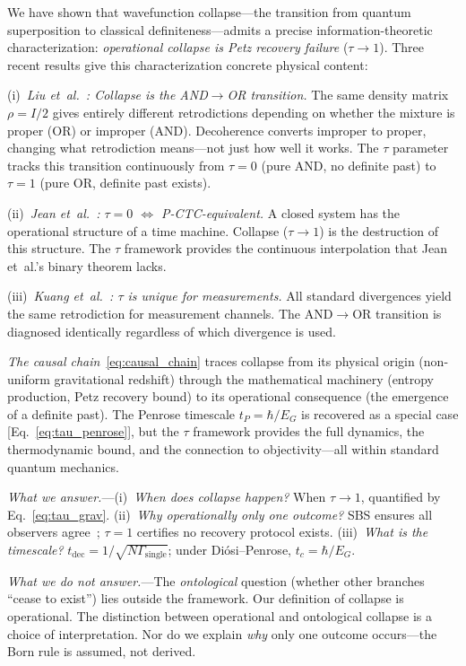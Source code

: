\documentclass[prl,twocolumn,superscriptaddress,longbibliography,floatfix]{revtex4-2}
\newcommand{\tauasym}{\tau}
\begin{document}
We have shown that wavefunction collapse---the transition from quantum
superposition to classical definiteness---admits a precise
information-theoretic characterization: \emph{operational collapse
is Petz recovery failure} ($\tauasym \to 1$).  Three recent results
give this characterization concrete physical content:

(i)~\emph{Liu et~al.~\cite{Liu2026}: Collapse is the AND$\to$OR
transition.}  The same density matrix $\rho = I/2$ gives entirely
different retrodictions depending on whether the mixture is proper
(OR) or improper (AND).  Decoherence converts improper to proper,
changing what retrodiction means---not just how well it works.
The $\tauasym$ parameter tracks this transition continuously from
$\tauasym = 0$ (pure AND, no definite past) to $\tauasym = 1$
(pure OR, definite past exists).

(ii)~\emph{Jean et~al.~\cite{Jean2025}: $\tauasym = 0$
$\Leftrightarrow$ P-CTC-equivalent.}  A closed system has the
operational structure of a time machine.  Collapse
($\tauasym \to 1$) is the destruction of this structure.  The
$\tauasym$ framework provides the continuous interpolation that
Jean et~al.'s binary theorem lacks.

(iii)~\emph{Kuang et~al.~\cite{Kuang2025}: $\tauasym$ is unique for
measurements.}  All standard divergences yield the same retrodiction
for measurement channels.  The AND$\to$OR transition is
diagnosed identically regardless of which divergence is used.

\emph{The causal chain}~\eqref{eq:causal_chain} traces collapse from
its physical origin (non-uniform gravitational redshift) through
the mathematical machinery (entropy production, Petz recovery bound)
to its operational consequence (the emergence of a definite past).
The Penrose timescale $t_P = \hbar/E_G$ is recovered as a special
case [Eq.~\eqref{eq:tau_penrose}], but the $\tauasym$ framework
provides the full dynamics, the thermodynamic bound, and the
connection to objectivity---all within standard quantum mechanics.

\emph{What we answer.}---(i)~\emph{When does collapse happen?}  When
$\tauasym \to 1$, quantified by Eq.~\eqref{eq:tau_grav}.
(ii)~\emph{Why operationally only one outcome?}  SBS ensures all
observers agree~\cite{Korbicz2021}; $\tauasym = 1$ certifies
no recovery protocol exists.  (iii)~\emph{What is the timescale?}
$t_{\mathrm{dec}} = 1/\sqrt{N\Gamma_{\mathrm{single}}}$; under
Di\'{o}si--Penrose, $t_c = \hbar/E_G$.

\emph{What we do not answer.}---The \emph{ontological} question
(whether other branches ``cease to exist'') lies outside the
framework.  Our definition of collapse is operational.  The
distinction between operational and ontological collapse is a choice
of interpretation.  Nor do we explain \emph{why} only one outcome
occurs---the Born rule is assumed, not derived.
\end{document}
